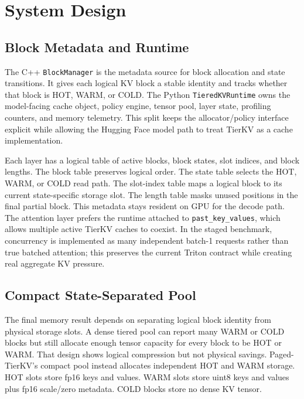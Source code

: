 \documentclass{article}
\begin{document}
\section{System Design}

\subsection{Block Metadata and Runtime}

The C++ \texttt{BlockManager} is the metadata source for block allocation and state transitions. It gives each logical KV block a stable identity and tracks whether that block is HOT, WARM, or COLD. The Python \texttt{TieredKVRuntime} owns the model-facing cache object, policy engine, tensor pool, layer state, profiling counters, and memory telemetry. This split keeps the allocator/policy interface explicit while allowing the Hugging Face model path to treat TierKV as a cache implementation.

Each layer has a logical table of active blocks, block states, slot indices, and block lengths. The block table preserves logical order. The state table selects the HOT, WARM, or COLD read path. The slot-index table maps a logical block to its current state-specific storage slot. The length table masks unused positions in the final partial block. This metadata stays resident on GPU for the decode path. The attention layer prefers the runtime attached to \texttt{past\_key\_values}, which allows multiple active TierKV caches to coexist. In the staged benchmark, concurrency is implemented as many independent batch-1 requests rather than true batched attention; this preserves the current Triton contract while creating real aggregate KV pressure.

\subsection{Compact State-Separated Pool}

The final memory result depends on separating logical block identity from physical storage slots. A dense tiered pool can report many WARM or COLD blocks but still allocate enough tensor capacity for every block to be HOT or WARM. That design shows logical compression but not physical savings. Paged-TierKV's compact pool instead allocates independent HOT and WARM storage. HOT slots store fp16 keys and values. WARM slots store uint8 keys and values plus fp16 scale/zero metadata. COLD blocks store no dense KV tensor.
\end{document}
